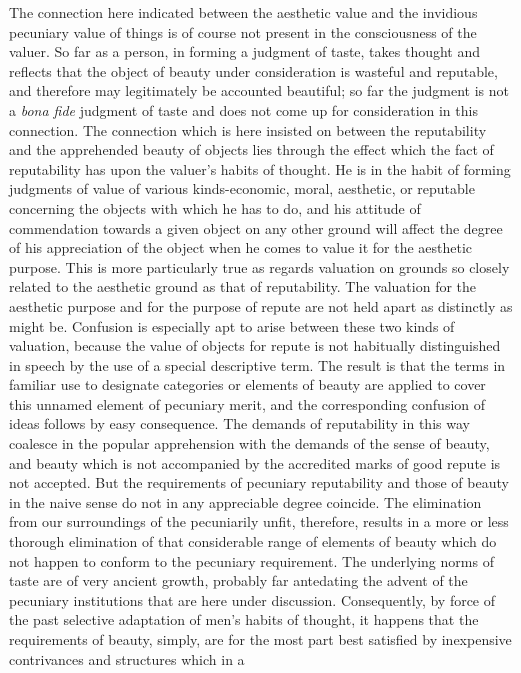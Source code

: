 \documentclass[12pt]{report}
\begin{document}
The connection here indicated between the aesthetic value and the
invidious pecuniary value of things is of course not present in the
consciousness of the valuer. So far as a person, in forming a judgment
of taste, takes thought and reflects that the object of beauty under
consideration is wasteful and reputable, and therefore may legitimately
be accounted beautiful; so far the judgment is not a \emph{bona fide} judgment
of taste and does not come up for consideration in this connection. The
connection which is here insisted on between the reputability and the
apprehended beauty of objects lies through the effect which the fact of
reputability has upon the valuer's habits of thought. He is in the
habit of forming judgments of value of various kinds-economic, moral,
aesthetic, or reputable concerning the objects with which he has to do,
and his attitude of commendation towards a given object on any other
ground will affect the degree of his appreciation of the object when he
comes to value it for the aesthetic purpose. This is more particularly
true as regards valuation on grounds so closely related to the aesthetic
ground as that of reputability. The valuation for the aesthetic purpose
and for the purpose of repute are not held apart as distinctly as might
be. Confusion is especially apt to arise between these two kinds of
valuation, because the value of objects for repute is not habitually
distinguished in speech by the use of a special descriptive term. The
result is that the terms in familiar use to designate categories
or elements of beauty are applied to cover this unnamed element of
pecuniary merit, and the corresponding confusion of ideas follows by
easy consequence. The demands of reputability in this way coalesce in
the popular apprehension with the demands of the sense of beauty, and
beauty which is not accompanied by the accredited marks of good repute
is not accepted. But the requirements of pecuniary reputability and
those of beauty in the naive sense do not in any appreciable degree
coincide. The elimination from our surroundings of the pecuniarily
unfit, therefore, results in a more or less thorough elimination of that
considerable range of elements of beauty which do not happen to conform
to the pecuniary requirement. The underlying norms of taste are of very
ancient growth, probably far antedating the advent of the pecuniary
institutions that are here under discussion. Consequently, by force of
the past selective adaptation of men's habits of thought, it happens
that the requirements of beauty, simply, are for the most part best
satisfied by inexpensive contrivances and structures which in a
\end{document}
